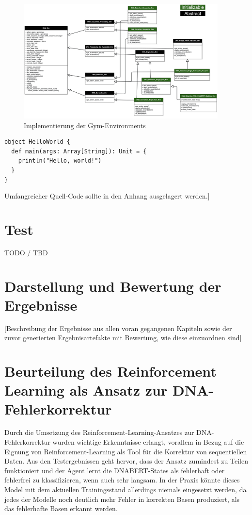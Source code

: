 \documentclass[oneside,bibliography=totocnumbered,BCOR=5mm]{scrbook}%
\theoremstyle{definition}
\theoremstyle{definition}
\theoremstyle{definition}
\theoremstyle{definition}
\theoremstyle{definition}
\theoremstyle{definition}
\begin{document}
\begin{figure}[t!]
  \centering
  \includegraphics[width=400px,keepaspectratio]{images/classes.png}
  \caption{Implementierung der Gym-Environments}
  \label{gymClasses}
\end{figure}

\begin{lstlisting}[caption={Ein Beispiel: Hello World (Scala)}]
object HelloWorld {
  def main(args: Array[String]): Unit = {
    println("Hello, world!")
  }
}
\end{lstlisting}

Umfangreicher Quell-Code sollte in den Anhang ausgelagert werden.]


\chapter{Test}
TODO / TBD

\chapter{Darstellung und Bewertung der Ergebnisse}
[Beschreibung der Ergebnisse aus allen voran gegangenen Kapiteln sowie der zuvor generierten Ergebnisartefakte mit Bewertung, wie diese einzuordnen sind]

\chapter{Beurteilung des Reinforcement Learning als Ansatz zur DNA-Fehlerkorrektur}
Durch die Umsetzung des Reinforcement-Learning-Ansatzes zur DNA-Fehlerkorrektur wurden wichtige Erkenntnisse erlangt,
vorallem in Bezug auf die Eignung von Reinforcement-Learning als Tool für die Korrektur von sequentiellen Daten.
Aus den Testergebnissen geht hervor, dass der Ansatz zumindest zu Teilen funktioniert und der
Agent lernt die DNABERT-States als fehlerhaft oder fehlerfrei zu klassifizieren, wenn auch sehr langsam.
In der Praxis könnte dieses Model mit dem aktuellen Trainingsstand allerdings niemals eingesetzt werden, 
da jedes der Modelle noch deutlich mehr Fehler in korrekten Basen produziert, als das fehlerhafte Basen erkannt werden.
\end{document}
